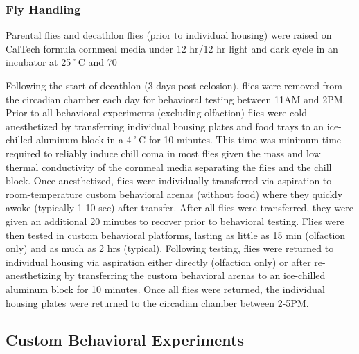 \documentclass[12pt,letterpaper]{article}
\begin{document}
\subsubsection{Fly Handling}

Parental flies and decathlon flies (prior to individual housing) were raised on CalTech formula cornmeal media under 12 hr/12 hr light and dark cycle in an incubator at 25˚C and 70%

Following the start of decathlon (3 days post-eclosion), flies were removed from the circadian chamber each day for behavioral testing between 11AM and 2PM. Prior to all behavioral experiments (excluding olfaction) flies were cold anesthetized by transferring individual housing plates and food trays to an ice-chilled aluminum block in a 4˚C for 10 minutes. This time was minimum time required to reliably induce chill coma in most flies given the mass and low thermal conductivity of the cornmeal media separating the flies and the chill block. Once anesthetized, flies were individually transferred via aspiration to room-temperature custom behavioral arenas (without food) where they quickly awoke (typically 1-10 sec) after transfer. After all flies were transferred, they were given an additional 20 minutes to recover prior to behavioral testing. Flies were then tested in custom behavioral platforms, lasting as little as 15 min (olfaction only) and as much as 2 hrs (typical). Following testing, flies were returned to individual housing via aspiration either directly (olfaction only) or after re-anesthetizing by transferring the custom behavioral arenas to an ice-chilled aluminum block for 10 minutes. Once all flies were returned, the individual housing plates were returned to the circadian chamber between 2-5PM.

\subsection{Custom Behavioral Experiments}
\end{document}
